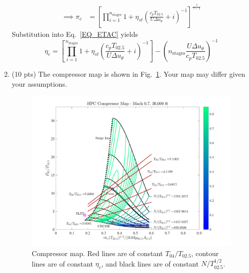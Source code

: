 \documentclass[12pt]{article}
\begin{document}
\begin{enumerate}[label=(\alph*)]
\begin{equation}
\begin{aligned}
				\implies \pi_c&=\left[\prod_{i=1}^{n_\mathrm{stages}} 1+\eta_{st}\left(\frac{c_pT_{02.5}}{U\Delta u_\theta}+i\right)^{-1}\right]^{\frac{\gamma}{\gamma-1}}
			\end{aligned}
		\end{equation}
		Substitution into Eq.~\ref{EQ_ETAC} yields
		\begin{equation}
			\eta_c=\boxed{\left[\prod_{i=1}^{n_\mathrm{stages}}1+\eta_{st}\left(\frac{c_pT_{02.5}}{U\Delta u_\theta}+i\right)^{-1}\right]-\left(n_\mathrm{stages}\frac{U\Delta u_\theta}{c_pT_{02.5}}\right)^{-1}}
		\end{equation}
	\item (10 pts)
		The compressor map is shown in Fig.~\ref{FIG_CM}. Your map may differ given your assumptions.		
		\begin{figure}[!ht!]
			\begin{center}
				\includegraphics[width=180mm]{compressorMap.pdf}
				\caption{\label{FIG_CM} Compressor map. Red lines are of constant $T_{04}/T_{02.5}$, contour lines are of constant $\eta_c$, and black lines are of constant $N/T_{02.5}^{1/2}$.}
			\end{center}
		\end{figure}
\end{enumerate}
\end{document}
